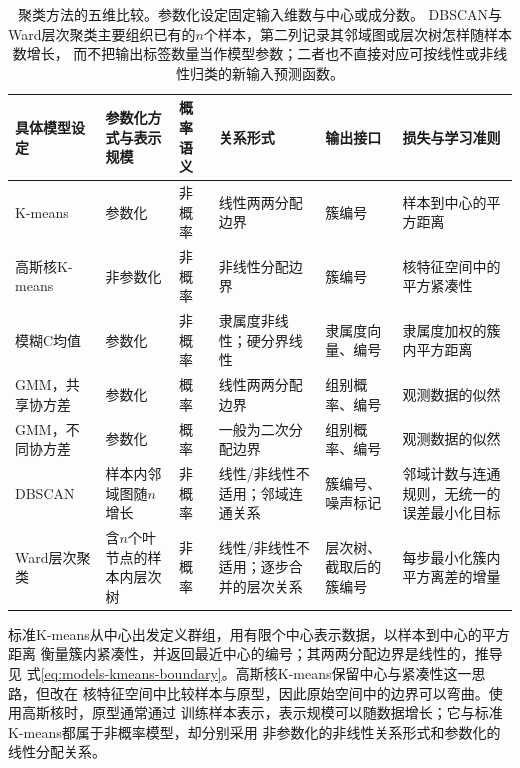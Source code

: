 \begin{table}[htbp]
  \centering
  \footnotesize
  \setlength{\tabcolsep}{4pt}
  \renewcommand{\arraystretch}{1.25}
  \begin{tabularx}{\linewidth}{@{}>{\raggedright\arraybackslash}p{28mm}>{\raggedright\arraybackslash}p{16mm}>{\raggedright\arraybackslash}p{11mm}>{\raggedright\arraybackslash}p{23mm}>{\raggedright\arraybackslash}p{22mm}>{\raggedright\arraybackslash}X@{}}
    \toprule
    \textbf{具体模型设定} & \textbf{参数化方式与表示规模} & \textbf{概率语义} & \textbf{关系形式} & \textbf{输出接口} & \textbf{损失与学习准则} \\
    \midrule
    K-means & 参数化 & 非概率 & 线性两两分配边界 & 簇编号 & 样本到中心的平方距离 \\
    高斯核K-means & 非参数化 & 非概率 & 非线性分配边界 & 簇编号 & 核特征空间中的平方紧凑性 \\
    模糊C均值 & 参数化 & 非概率 & 隶属度非线性；硬分界线性 & 隶属度向量、编号 & 隶属度加权的簇内平方距离 \\
    GMM，共享协方差 & 参数化 & 概率 & 线性两两分配边界 & 组别概率、编号 & 观测数据的似然 \\
    GMM，不同协方差 & 参数化 & 概率 & 一般为二次分配边界 & 组别概率、编号 & 观测数据的似然 \\
    DBSCAN & 样本内邻域图随$n$增长 & 非概率 & 线性/非线性不适用；邻域连通关系 & 簇编号、噪声标记 & 邻域计数与连通规则，无统一的误差最小化目标 \\
    Ward层次聚类 & 含$n$个叶节点的样本内层次树 & 非概率 & 线性/非线性不适用；逐步合并的层次关系 & 层次树、截取后的簇编号 & 每步最小化簇内平方离差的增量 \\
    \bottomrule
  \end{tabularx}
  \caption{聚类方法的五维比较。参数化设定固定输入维数与中心或成分数。
  DBSCAN与Ward层次聚类主要组织已有的$n$个样本，第二列记录其邻域图或层次树怎样随样本数增长，
  而不把输出标签数量当作模型参数；二者也不直接对应可按线性或非线性归类的新输入预测函数。}
  \label{tab:models-clusterers}
\end{table}
\FloatBarrier

标准K-means从中心出发定义群组，用有限个中心表示数据，以样本到中心的平方距离
衡量簇内紧凑性，并返回最近中心的编号；其两两分配边界是线性的，推导见
式\eqref{eq:models-kmeans-boundary}。高斯核K-means保留中心与紧凑性这一思路，但改在
核特征空间中比较样本与原型，因此原始空间中的边界可以弯曲。使用高斯核时，原型通常通过
训练样本表示，表示规模可以随数据增长；它与标准K-means都属于非概率模型，却分别采用
非参数化的非线性关系形式和参数化的线性分配关系。

